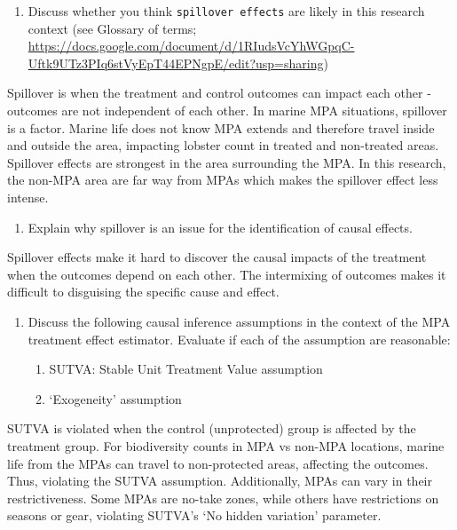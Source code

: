 \documentclass[
]{article}
\providecommand{\tightlist}{%
  \setlength{\itemsep}{0pt}\setlength{\parskip}{0pt}}
\begin{document}
\begin{enumerate}
\def\labelenumi{\alph{enumi}.}
\tightlist
\item
  Discuss whether you think \texttt{spillover\ effects} are likely in
  this research context (see Glossary of terms;
  \url{https://docs.google.com/document/d/1RIudsVcYhWGpqC-Uftk9UTz3PIq6stVyEpT44EPNgpE/edit?usp=sharing})
\end{enumerate}

Spillover is when the treatment and control outcomes can impact each
other - outcomes are not independent of each other. In marine MPA
situations, spillover is a factor. Marine life does not know MPA extends
and therefore travel inside and outside the area, impacting lobster
count in treated and non-treated areas. Spillover effects are strongest
in the area surrounding the MPA. In this research, the non-MPA area are
far way from MPAs which makes the spillover effect less intense.

\begin{enumerate}
\def\labelenumi{\alph{enumi}.}
\setcounter{enumi}{1}
\tightlist
\item
  Explain why spillover is an issue for the identification of causal
  effects.
\end{enumerate}

Spillover effects make it hard to discover the causal impacts of the
treatment when the outcomes depend on each other. The intermixing of
outcomes makes it difficult to disguising the specific cause and effect.

\begin{enumerate}
\def\labelenumi{\alph{enumi}.}
\setcounter{enumi}{2}
\item
  Discuss the following causal inference assumptions in the context of
  the MPA treatment effect estimator. Evaluate if each of the assumption
  are reasonable:

  \begin{enumerate}
  \def\labelenumii{\arabic{enumii})}
  \tightlist
  \item
    SUTVA: Stable Unit Treatment Value assumption
  \item
    `Exogeneity' assumption
  \end{enumerate}
\end{enumerate}

SUTVA is violated when the control (unprotected) group is affected by
the treatment group. For biodiversity counts in MPA vs non-MPA
locations, marine life from the MPAs can travel to non-protected areas,
affecting the outcomes. Thus, violating the SUTVA assumption.
Additionally, MPAs can vary in their restrictiveness. Some MPAs are
no-take zones, while others have restrictions on seasons or gear,
violating SUTVA's `No hidden variation' parameter.
\end{document}
